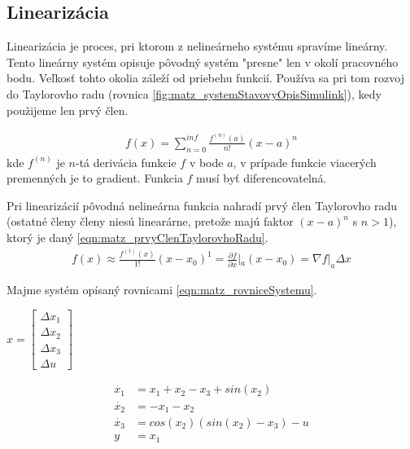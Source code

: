 \documentclass[../main.tex]{subfiles}
\begin{document}
\subsection{Linearizácia}
Linearizácia je proces, pri ktorom z nelineárneho systému spravíme lineárny. Tento lineárny systém opisuje pôvodný systém "presne" len v okolí pracovného bodu. Veľkosť tohto okolia záleží od priebehu funkcií. Používa sa pri tom rozvoj do Taylorovho radu (rovnica \ref{fig:matz_systemStavovyOpisSimulink}), kedy použijeme len prvý člen.

\begin{equation}
	\begin{aligned}
		f(x) = \sum^{inf}_{n=0}{\frac{f^{(n)}(a)}{n!}(x-a)^n}
	\end{aligned}
	\label{eqn:matz_taylorovRad}
\end{equation}
kde $f^{(n)}$ je $n$-tá derivácia funkcie $f$ v bode $a$, v prípade funkcie viacerých premenných je to gradient. Funkcia $f$ musí byť diferencovatelná.

Pri linearizácií pôvodná nelineárna funkcia nahradí prvý člen Taylorovho radu (ostatné členy členy niesú linearárne, pretože majú faktor $(x-a)^n$ s $n > 1$), ktorý je daný \ref{eqn:matz_prvyClenTaylorovhoRadu}.
\begin{equation}
	\begin{aligned}
		f(x) \approx \frac{f^{(1)}(x)}{1!}(x-x_0)^1 = \frac{\partial{f}}{\partial{x}}|_{a}(x-x_0) = \nabla{f}|_{a}\Delta{x}
	\end{aligned}
	\label{eqn:matz_prvyClenTaylorovhoRadu}
\end{equation}

Majme systém opísaný rovnicami \ref{eqn:matz_rovniceSystemu}.
\begin{center}
$x = \begin{bmatrix}
\Delta{x_1} \\
\Delta{x_2} \\
\Delta{x_3} \\
\Delta{u}
\end{bmatrix}$
\end{center}
\begin{equation}
		\begin{aligned}
		\dot{x_1} &= x_1 + x_2 - x_3 + sin(x_2) 			\\
		\dot{x_2} &= - x_1 - x_2 						\\
		\dot{x_3} &= cos(x_2) (sin(x_2) - x_3) - u 	\\
		y &= x_1
		\end{aligned}
		\label{eqn:matz_rovniceSystemu}
\end{equation}
\end{document}
